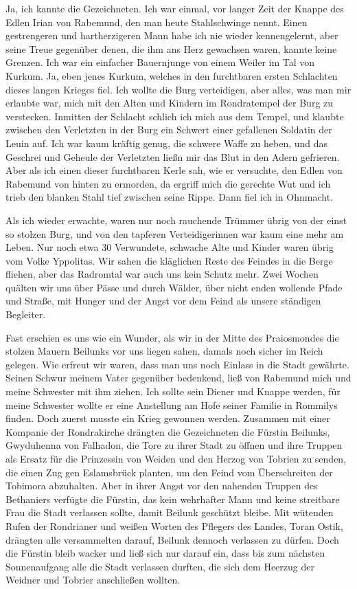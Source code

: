 Ja, ich kannte die Gezeichneten. Ich war einmal, vor langer Zeit der Knappe des Edlen Irian von Rabemund, den man heute Stahlschwinge nennt. Einen gestrengeren und hartherzigeren Mann habe ich nie wieder kennengelernt, aber seine Treue gegenüber denen, die ihm ans Herz gewachsen waren, kannte keine Grenzen. Ich war ein einfacher Bauernjunge von einem Weiler im Tal von Kurkum. Ja, eben jenes Kurkum, welches in den furchtbaren ersten Schlachten dieses langen Krieges fiel. Ich wollte die Burg verteidigen, aber alles, was man mir erlaubte war, mich mit den Alten und Kindern im Rondratempel der Burg zu verstecken. Inmitten der Schlacht schlich ich mich aus dem Tempel, und klaubte zwischen den Verletzten in der Burg ein Schwert einer gefallenen Soldatin der Leuin auf. Ich war kaum kräftig genug, die schwere Waffe zu heben, und das Geschrei und Geheule der Verletzten ließn mir das Blut in den Adern gefrieren. Aber als ich einen dieser furchtbaren Kerle sah, wie er versuchte, den Edlen von Rabemund von hinten zu ermorden, da ergriff mich die gerechte Wut und ich trieb den blanken Stahl tief zwischen seine Rippe. Dann fiel ich in Ohnmacht.

Als ich wieder erwachte, waren nur noch rauchende Trümmer übrig von der einst so stolzen Burg, und von den tapferen Verteidigerinnen war kaum eine mehr am Leben. Nur noch etwa 30 Verwundete, schwache Alte und Kinder waren übrig vom Volke Yppolitas. Wir sahen die kläglichen Reste des Feindes in die Berge fliehen, aber das Radromtal war auch uns kein Schutz mehr. Zwei Wochen quälten wir uns über Pässe und durch Wälder, über nicht enden wollende Pfade und Straße, mit Hunger und der Angst vor dem Feind als unsere ständigen Begleiter.

Fast erschien es uns wie ein Wunder, als wir in der Mitte des Praiosmondes die stolzen Mauern Beilunks vor uns liegen sahen, damals noch sicher im Reich gelegen. Wie erfreut wir waren, dass man uns noch Einlass in die Stadt gewährte. Seinen Schwur meinem Vater gegenüber bedenkend, ließ von Rabemund mich und meine Schwester mit ihm ziehen. Ich sollte sein Diener und Knappe werden, für meine Schwester wollte er eine Anstellung am Hofe seiner Familie in Rommilys finden. Doch zuerst musste ein Krieg gewonnen werden. Zusammen mit einer Kompanie der Rondrakirche drängten die Gezeichneten die Fürstin Beilunks, Gwyduhenna von Falhadon, die Tore zu ihrer Stadt zu öffnen und ihre Truppen als Ersatz für die Prinzessin von Weiden und den Herzog von Tobrien zu senden, die einen Zug gen Eslamsbrück planten, um den Feind vom Überschreiten der Tobimora abzuhalten. Aber in ihrer Angst vor den nahenden Truppen des Bethaniers verfügte die Fürstin, das kein wehrhafter Mann und keine streitbare Frau die Stadt verlassen sollte, damit Beilunk geschützt bleibe. Mit wütenden Rufen der Rondrianer und weißen Worten des Pflegers des Landes, Toran Ostik, drängten alle versammelten darauf, Beilunk dennoch verlassen zu dürfen. Doch die Fürstin bleib wacker und ließ sich nur darauf ein, dass bis zum nächsten Sonnenaufgang alle die Stadt verlassen durften, die sich dem Heerzug der Weidner und Tobrier anschließen wollten.

